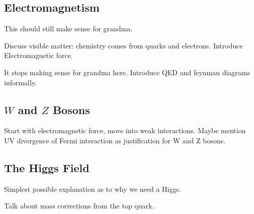 \subsection{Electromagnetism}

This should still make sense for grandma.

Discuss visible matter: chemistry comes from quarks and electrons. Introduce Electromagnetic force.

It stops making sense for grandma here. Introduce QED and feynman diagrams informally.

\subsection{$W$ and $Z$ Bosons}
Start with electromagnetic force, move into weak interactions. Maybe mention UV divergence of Fermi interaction as justification for W and Z bosons.
\subsection{The Higgs Field}
Simplest possible explanation as to why we need a Higgs.

Talk about mass corrections from the top quark.

